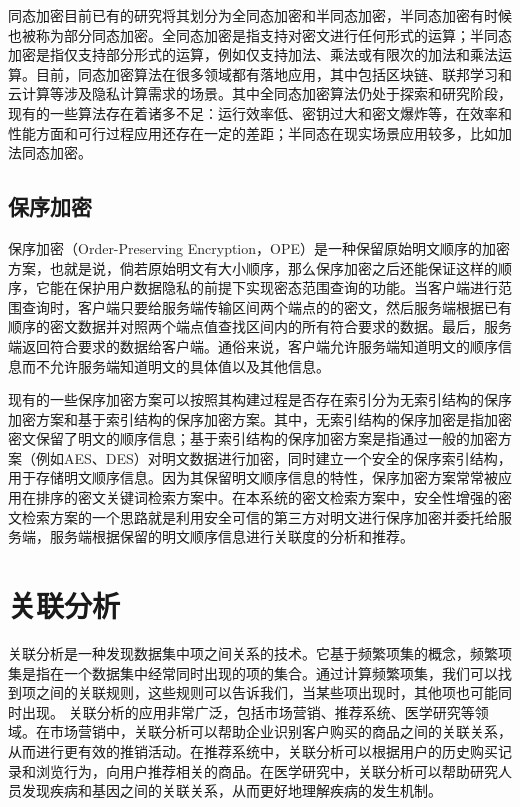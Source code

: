 \documentclass[promaster]{thesis-uestc}
\begin{document}
同态加密目前已有的研究将其划分为全同态加密和半同态加密，半同态加密有时候也被称为部分同态加密。全同态加密是指支持对密文进行任何形式的运算；半同态加密是指仅支持部分形式的运算，例如仅支持加法、乘法或有限次的加法和乘法运算。目前，同态加密算法在很多领域都有落地应用，其中包括区块链、联邦学习和云计算等涉及隐私计算需求的场景。其中全同态加密算法仍处于探索和研究阶段，现有的一些算法存在着诸多不足：运行效率低、密钥过大和密文爆炸等，在效率和性能方面和可行过程应用还存在一定的差距；半同态在现实场景应用较多，比如加法同态加密。


\subsection{保序加密}\label{保序加密}

保序加密（Order-Preserving Encryption，OPE）是一种保留原始明文顺序的加密方案，也就是说，倘若原始明文有大小顺序，那么保序加密之后还能保证这样的顺序，它能在保护用户数据隐私的前提下实现密态范围查询的功能。当客户端进行范围查询时，客户端只要给服务端传输区间两个端点的的密文，然后服务端根据已有顺序的密文数据并对照两个端点值查找区间内的所有符合要求的数据。最后，服务端返回符合要求的数据给客户端。通俗来说，客户端允许服务端知道明文的顺序信息而不允许服务端知道明文的具体值以及其他信息。

现有的一些保序加密方案可以按照其构建过程是否存在索引分为无索引结构的保序加密方案和基于索引结构的保序加密方案。其中，无索引结构的保序加密是指加密密文保留了明文的顺序信息；基于索引结构的保序加密方案是指通过一般的加密方案（例如AES、DES）对明文数据进行加密，同时建立一个安全的保序索引结构，用于存储明文顺序信息。因为其保留明文顺序信息的特性，保序加密方案常常被应用在排序的密文关键词检索方案中。在本系统的密文检索方案中，安全性增强的密文检索方案的一个思路就是利用安全可信的第三方对明文进行保序加密并委托给服务端，服务端根据保留的明文顺序信息进行关联度的分析和推荐。

\section{关联分析}
关联分析是一种发现数据集中项之间关系的技术。它基于频繁项集的概念，频繁项集是指在一个数据集中经常同时出现的项的集合。通过计算频繁项集，我们可以找到项之间的关联规则，这些规则可以告诉我们，当某些项出现时，其他项也可能同时出现。
关联分析的应用非常广泛，包括市场营销、推荐系统、医学研究等领域。在市场营销中，关联分析可以帮助企业识别客户购买的商品之间的关联关系，从而进行更有效的推销活动。在推荐系统中，关联分析可以根据用户的历史购买记录和浏览行为，向用户推荐相关的商品。在医学研究中，关联分析可以帮助研究人员发现疾病和基因之间的关联关系，从而更好地理解疾病的发生机制。
\end{document}
